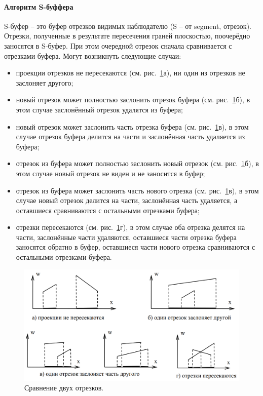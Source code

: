 \paragraph{Алгоритм S-буффера}

\hspace{1.25cm}
S-буфер -- это буфер отрезков видимых наблюдателю (S -- от segment,
отрезок). Отрезки, полученные в результате пересечения граней плоскостью, поочерёдно заносятся в S-буфер. При этом очередной отрезок сначала сравнивается с отрезками буфера. Могут возникнуть следующие случаи:

\begin{itemize}
\item проекции отрезков не пересекаются (см. рис.~\ref{fig:Sbuff_algorithm_1}а), ни один из отрезков не заслоняет другого;
\item новый отрезок может полностью заслонить отрезок буфера (см. рис.~\ref{fig:Sbuff_algorithm_1}б), в этом случае заслонённый отрезок удалятся из буфера;
\item новый отрезок может заслонить часть отрезка буфера (см. рис.~\ref{fig:Sbuff_algorithm_1}в), в этом случае отрезок буфера делится на части и заслонённая часть удаляется из буфера;
\item отрезок из буфера может полностью заслонить новый отрезок (см.
рис.~\ref{fig:Sbuff_algorithm_1}б), в этом случае новый отрезок не виден и не заносится в буфер;
\item отрезок из буфера может заслонить часть нового отрезка (см. рис.~\ref{fig:Sbuff_algorithm_1}в), в этом случае новый отрезок делится на части, заслонённая часть удаляется, а оставшиеся сравниваются с остальными отрезками буфера;
\item отрезки пересекаются (см. рис.~\ref{fig:Sbuff_algorithm_1}г), в этом случае оба отрезка делятся на части, заслонённые части удаляются, оставшиеся части отрезка буфера заносятся обратно в буфер, оставшиеся части нового отрезка сравниваются с остальными отрезками буфера. 
\end{itemize}

\begin{figure}[H]
    \centering
    \includegraphics[width=\textwidth]{img/Sbuff_algorithm_1.png}
    \caption{Сравнение двух отрезков.}
    \label{fig:Sbuff_algorithm_1}
\end{figure}

